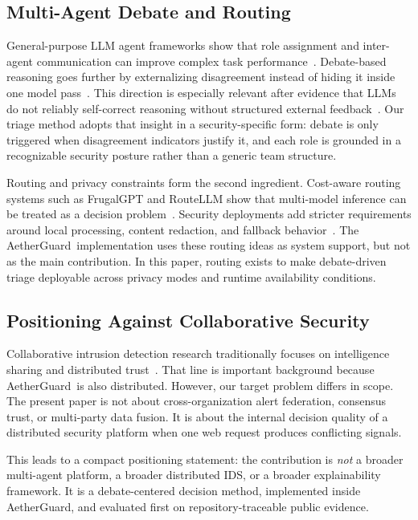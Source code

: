 \documentclass[pdflatex,sn-mathphys-num]{sn-jnl}
\newcommand{\system}{AetherGuard}
\begin{document}
\subsection{Multi-Agent Debate and Routing}

General-purpose LLM agent frameworks show that role assignment and inter-agent communication can improve complex task performance~\cite{wang2024autonomous,wu2024autogen,hong2024metagpt}. Debate-based reasoning goes further by externalizing disagreement instead of hiding it inside one model pass~\cite{du2024debate}. This direction is especially relevant after evidence that LLMs do not reliably self-correct reasoning without structured external feedback~\cite{huang2024selfcorrect,gou2024critic}. Our triage method adopts that insight in a security-specific form: debate is only triggered when disagreement indicators justify it, and each role is grounded in a recognizable security posture rather than a generic team structure.

Routing and privacy constraints form the second ingredient. Cost-aware routing systems such as FrugalGPT and RouteLLM show that multi-model inference can be treated as a decision problem~\cite{chen2023frugalgpt,ong2024routellm}. Security deployments add stricter requirements around local processing, content redaction, and fallback behavior~\cite{chen2025privacy}. The \system\ implementation uses these routing ideas as system support, but not as the main contribution. In this paper, routing exists to make debate-driven triage deployable across privacy modes and runtime availability conditions.

\subsection{Positioning Against Collaborative Security}

Collaborative intrusion detection research traditionally focuses on intelligence sharing and distributed trust~\cite{vasilomanolakis2016taxonomy}. That line is important background because \system\ is also distributed. However, our target problem differs in scope. The present paper is not about cross-organization alert federation, consensus trust, or multi-party data fusion. It is about the internal decision quality of a distributed security platform when one web request produces conflicting signals.

This leads to a compact positioning statement: the contribution is \emph{not} a broader multi-agent platform, a broader distributed IDS, or a broader explainability framework. It is a debate-centered decision method, implemented inside \system, and evaluated first on repository-traceable public evidence.
\end{document}
